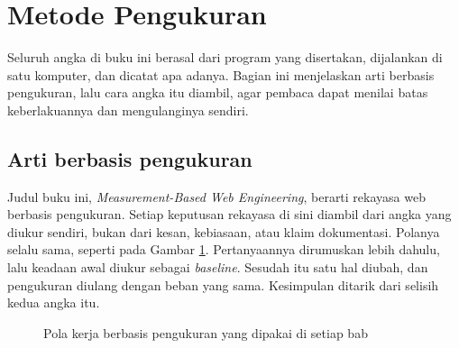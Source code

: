 \chapter*{Metode Pengukuran}

Seluruh angka di buku ini berasal dari program yang disertakan, dijalankan
di satu komputer, dan dicatat apa adanya. Bagian ini menjelaskan arti
berbasis pengukuran, lalu cara angka itu diambil, agar pembaca dapat menilai
batas keberlakuannya dan mengulanginya sendiri.

\section*{Arti berbasis pengukuran}

Judul buku ini, \textit{Measurement-Based Web Engineering}, berarti rekayasa
web berbasis pengukuran. Setiap keputusan rekayasa di sini diambil dari angka
yang diukur sendiri, bukan dari kesan, kebiasaan, atau klaim dokumentasi.
Polanya selalu sama, seperti pada Gambar \ref{fig:pola-ukur}. Pertanyaannya
dirumuskan lebih dahulu, lalu keadaan awal diukur sebagai \textit{baseline}.
Sesudah itu satu hal diubah, dan pengukuran diulang dengan beban yang sama.
Kesimpulan ditarik dari selisih kedua angka itu.

\begin{figure}[!htb]
  \centering
  \caption{Pola kerja berbasis pengukuran yang dipakai di setiap bab}
  \label{fig:pola-ukur}
\end{figure}

